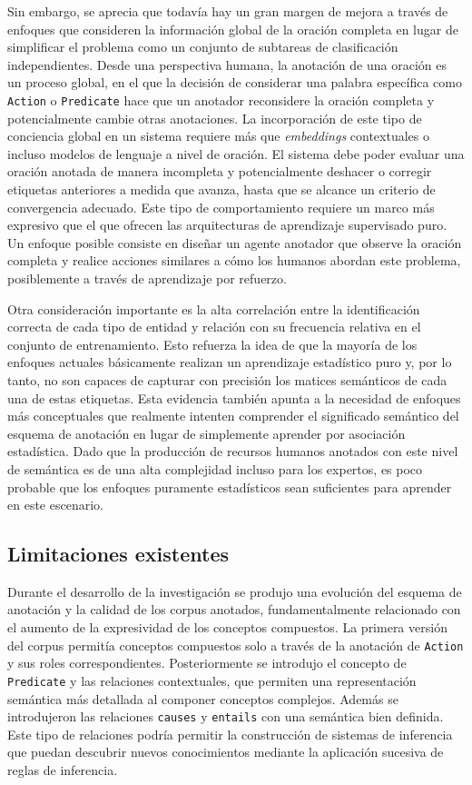Sin embargo, se aprecia que todavía hay un gran margen de mejora a través de enfoques que consideren la información global de la oración completa en lugar de simplificar el problema como un conjunto de subtareas de clasificación independientes.
Desde una perspectiva humana, la anotación de una oración es un proceso global, en el que la decisión de considerar una palabra específica como \texttt{Action} o \texttt{Predicate} hace que un anotador reconsidere la oración completa y potencialmente cambie otras anotaciones.
La incorporación de este tipo de conciencia global en un sistema requiere más que \textit{embeddings} contextuales o incluso modelos de lenguaje a nivel de oración. El sistema debe poder evaluar una oración anotada de manera incompleta y potencialmente deshacer o corregir etiquetas anteriores a medida que avanza, hasta que se alcance un criterio de convergencia adecuado.
Este tipo de comportamiento requiere un marco más expresivo que el que ofrecen las arquitecturas de aprendizaje supervisado puro.
Un enfoque posible consiste en diseñar un agente anotador que observe la oración completa y realice acciones similares a cómo los humanos abordan este problema, posiblemente a través de aprendizaje por refuerzo.

Otra consideración importante es la alta correlación entre la identificación correcta de cada tipo de entidad y relación con su frecuencia relativa en el conjunto de entrenamiento.
Esto refuerza la idea de que la mayoría de los enfoques actuales básicamente realizan un aprendizaje estadístico puro y, por lo tanto, no son capaces de capturar con precisión los matices semánticos de cada una de estas etiquetas.
Esta evidencia también apunta a la necesidad de enfoques más conceptuales que realmente intenten comprender el significado semántico del esquema de anotación en lugar de simplemente aprender por asociación estadística.
Dado que la producción de recursos humanos anotados con este nivel de semántica es de una alta complejidad incluso para los expertos, es poco probable que los enfoques puramente estadísticos sean suficientes para aprender en este escenario.

\subsection{Limitaciones existentes}

Durante el desarrollo de la investigación se produjo una evolución del esquema de anotación y la calidad de los corpus anotados, fundamentalmente relacionado con el aumento de la expresividad de los conceptos compuestos.
La primera versión del corpus permitía conceptos compuestos solo a través de la anotación de \texttt{Action} y sus roles correspondientes.
Posteriormente se introdujo el concepto de \texttt{Predicate} y las relaciones contextuales, que permiten una representación semántica más detallada al componer conceptos complejos.
Además se introdujeron las relaciones \texttt{causes} y \texttt{entails} con una semántica bien definida.
Este tipo de relaciones podría permitir la construcción de sistemas de inferencia que puedan descubrir nuevos conocimientos mediante la aplicación sucesiva de reglas de inferencia.

